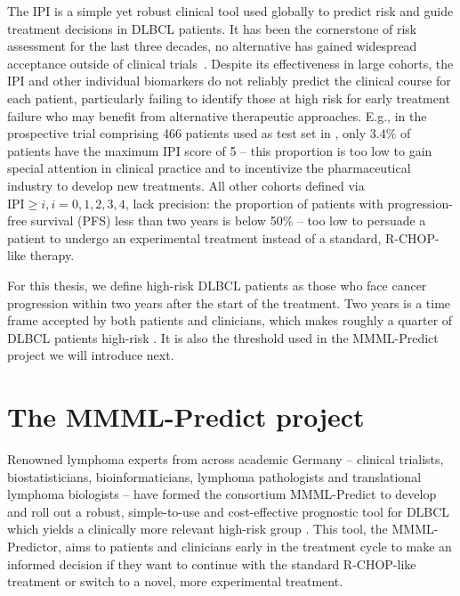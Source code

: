 The IPI is a simple yet robust clinical tool used globally to predict risk and guide 
treatment decisions in DLBCL patients. It has been the cornerstone of risk assessment for the last 
three decades, no alternative has gained widespread acceptance outside of clinical 
trials~\citep{ipi-stay-strong}. 
Despite its effectiveness in large cohorts, the IPI and other individual 
biomarkers do not reliably predict the clinical course for each patient, particularly failing to 
identify those at high risk for early treatment failure who may benefit from alternative therapeutic 
approaches. E.g., in the prospective trial comprising \num{466} patients used as test set in 
\citep{staiger20}, only \num{3.4}\% of patients have the maximum IPI score of 5 -- this proportion 
is too low 
to gain special attention in clinical practice and to incentivize the pharmaceutical industry to 
develop new treatments. All other cohorts defined via $\text{IPI} \geq i, i = 0, 1, 2, 3, 4$, lack 
precision: the proportion of patients with progression-free survival (PFS) less than two years is below 
\num{50}\% -- too low to persuade a patient to undergo an experimental treatment instead of a 
standard, R-CHOP-like therapy.

For this thesis, we define high-risk DLBCL patients as those who face cancer progression 
within two years after the start of the treatment. Two years is a time frame accepted by both 
patients and clinicians, which makes roughly a quarter of DLBCL patients high-risk \cite{staiger20}.
It is also the threshold used in the MMML-Predict project we will introduce next.

\section{The MMML-Predict project} \label{sec:intro-mmml}

Renowned lymphoma experts from across academic Germany -- clinical trialists, biostatisticians, 
bioinformaticians, lymphoma pathologists and translational lymphoma biologists -- have formed the 
consortium MMML-Predict to develop and roll out a robust, simple-to-use and cost-effective 
prognostic tool for DLBCL 
which yields a clinically more relevant high-risk group \cite{mmml-chapuy,mmml-idw}. This tool, the 
MMML-Predictor, aims to 
patients and clinicians early in the treatment cycle to make an informed decision if they want to 
continue with the standard R-CHOP-like treatment or switch to a novel, more experimental treatment. 

